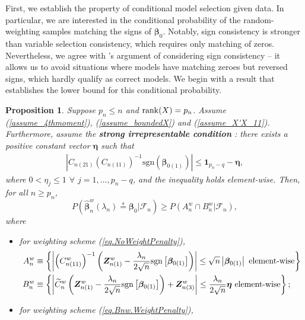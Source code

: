 \documentclass[ejs,authoryear,linksfromyear]{imsart}
\newcommand{\bnw}{\widehat{\bm{\beta}}_n^w} %
\newcommand{\cnwa}{C_{n(11)}^w}
\newcommand{\znwa}{\bm{Z}_{n(1)}^w}
\newcommand{\znwc}{\bm{Z}_{n(3)}^w}
\numberwithin{equation}{section}
\theoremstyle{plain}
\newtheorem{proposition}{Proposition}[section]
\begin{document}
First, we establish the property of conditional model selection given data. In particular, we are interested in the conditional probability of the random-weighting samples matching the signs of $\bm{\beta}_0$. Notably, sign consistency is stronger than variable selection consistency, which requires only matching of zeros. Nevertheless, we agree with \citet{BinYu}'s argument of considering sign consistency -- it allows us to avoid situations where models have matching zeroes but reversed signs, which hardly qualify as correct models. We begin with a result that establishes the lower bound for this conditional probability.    
\begin{proposition} \label{lem_ModelSelect}
	Suppose $p_n \leq n$ and ${\rm rank}(X) = p_n$. Assume (\ref{assume_4thmoment}), (\ref{assume_boundedX}) and (\ref{assume_X'X_11}). Furthermore, assume the \textbf{strong irrepresentable condition} \citep{BinYu}: there exists a positive constant vector $\bm{\eta}$ such that 
	\begin{align} \label{assume_StrongIrrepresent}
	\left|
	C_{n(21)} 
	\left( C_{n(11)} \right)^{-1} 
	\text{sgn} \left( \bm{\beta}_{0(1)} \right)
	\right| \leq
	\bm{1}_{p_n-q} - \bm{\eta},
	\end{align}
	where $0 < \eta_j \leq 1$ $\forall$ $j = 1, \ldots, p_n-q$, and the inequality holds element-wise. Then, for all $n \geq p_n$,
	$$
	P\left(
	\bnw (\lambda_n) \stackrel{s}{=} \bm{\beta}_0
	\big| \mathcal{F}_n
	\right)	\geq 
	P \left( 
	A_n^w \cap B_n^w 
	\big| \mathcal{F}_n
	\right),
	$$ 
	where
	\begin{itemize}[wide]
		\item [(a)] for weighting scheme (\ref{eq.NoWeightPenalty}),
		\begin{align*}
		A_n^w &\equiv  
		\left\{
		\left\vert 
		\left( \cnwa \right)^{-1} 
		\left(
		\znwa - 
		\dfrac{\lambda_n}{2 \sqrt{n}} 
		\text{sgn} \left[ \bm{\beta}_{0(1)} \right]
		\right)
		\right\vert
		\leq  \sqrt{n}
		\left\vert \bm{\beta}_{0(1)} \right\vert
		\,\, \text{{\rm element-wise}}
		\right\} \\
		B_n^w &\equiv 
		\left\{
		\left\vert 
		\widetilde{C}^w_n 
		\left(
		\znwa - 
		\dfrac{\lambda_n}{2 \sqrt{n}} 
		\text{sgn} \left[ \bm{\beta}_{0(1)} \right]
		\right)
		+ \znwc 
		\right\vert
		\leq 
		\dfrac{\lambda_n}{2 \sqrt{n}} 
		\bm{\eta} 
		\,\, \text{{\rm element-wise}}
		\right\} ;
		\end{align*}
		\item [(b)] for weighting scheme (\ref{eq.Bnw.WeightPenalty}),

\end{itemize}
\end{proposition}
\end{document}
